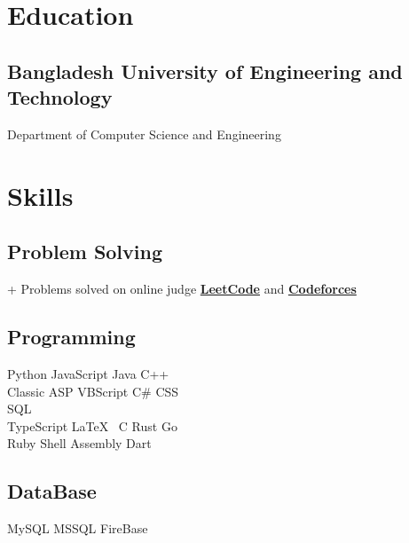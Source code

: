 \documentclass[]{plushcv}
\begin{document}
\begin{minipage}[t]{0.31\textwidth} 

\section{Education} 
\subsection{Bangladesh University of Engineering and Technology}
Department of Computer Science and Engineering \\
\sectionsep



\section{Skills}
\subsection{Problem Solving}
+ Problems solved on online judge 
\href{https://leetcode.com/An1ndya/}{\textbf{LeetCode}}
and 
\href{https://codeforces.com/profile/an1ndya}{\textbf{Codeforces}} 
\sectionsep
\sectionsep
\subsection{Programming}
\sectionsep
{}
Python\textbullet{} JavaScript \textbullet{} Java \textbullet{}   C++ 
\\ Classic ASP   \textbullet{} VBScript \textbullet{}  C\#   \textbullet{} CSS 
\\ SQL 
\\
\sectionsep
{}
TypeScript \textbullet{} \LaTeX\ \textbullet{} C \textbullet{} 
Rust  \textbullet{} Go \\
\sectionsep
{}
Ruby \textbullet{}  Shell \textbullet{} Assembly \textbullet{}  Dart  \\
\sectionsep
\subsection{DataBase}
\sectionsep
MySQL \textbullet{} MSSQL \textbullet{} FireBase  
\sectionsep

\end{minipage}
\end{document}
